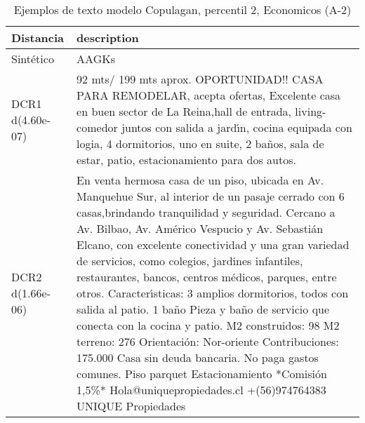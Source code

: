 \begin{table}[H]
\centering
\fontsize{10}{14}\selectfont
\caption{Ejemplos de texto modelo Copulagan, percentil 2, Economicos (A-2)}
\label{table-example-economicos-a-2-copulagan-2p-text}
\begin{tabular}{|l|m{35em}|}
\hline
\rowcolor[gray]{0.8}
Distancia & description \\
\hline Sintético & AAGKs \\
\hline DCR1 d(4.60e-07) & 92 mts/ 199 mts aprox. OPORTUNIDAD!! CASA PARA REMODELAR, acepta ofertas, Excelente casa en buen sector de La Reina,hall de entrada, living- comedor juntos con salida a jard{\'\i}n, cocina equipada con logia, 4 dormitorios, uno en suite, 2 ba\~nos, sala de estar, patio, estacionamiento para dos autos. \\
\hline DCR2 d(1.66e-06) & En venta hermosa casa de un piso, ubicada en Av. Manquehue Sur, al interior de un pasaje cerrado con 6 casas,brindando tranquilidad y seguridad. Cercano a Av. Bilbao, Av. Am\'erico Vespucio y Av. Sebasti\'an Elcano, con excelente conectividad y una gran variedad de servicios, como colegios, jardines infantiles, restaurantes, bancos, centros m\'edicos, parques, entre otros.  Caracter{\'\i}sticas:  3 amplios dormitorios, todos con salida al patio. 1 ba\~no Pieza y ba\~no de servicio que conecta con la cocina y patio. M2 construidos: 98 M2 terreno: 276 Orientaci\'on: Nor-oriente Contribuciones: 175.000 Casa sin deuda bancaria. No paga gastos comunes. Piso parquet Estacionamiento  *Comisi\'on 1,5\%*  Hola@uniquepropiedades.cl +(56)974764383    UNIQUE Propiedades \\
\hline
\end{tabular}
\end{table}
